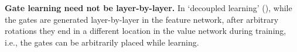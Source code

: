 \textbf{Gate learning need not be layer-by-layer.} In `decoupled learning' (), while the gates are generated layer-by-layer in the feature network, after arbitrary rotations they end in a different location in the value network during training, i.e., the gates can be arbitrarily placed while learning.

